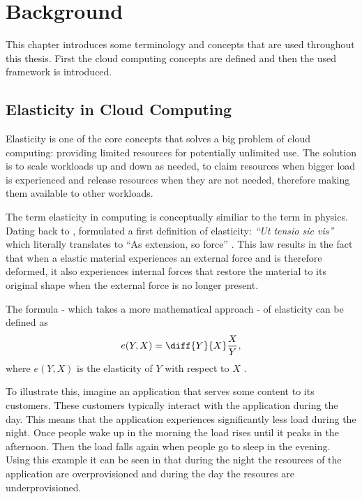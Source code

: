 \chapter{Background}
\label{ch:background}

This chapter introduces some terminology and concepts that are used throughout this thesis. First the cloud computing concepts are defined and then the used framework is introduced.

\section{Elasticity in Cloud Computing}
\label{sec:elasticity}

Elasticity is one of the core concepts that solves a big problem of cloud computing: providing limited resources for potentially unlimited use. The solution is to scale workloads up and down as needed, to claim resources when bigger load is experienced and release resources when they are not needed, therefore making them available to other workloads.

The term elasticity in computing is conceptually similiar to the term in physics. Dating back to \citeyear{hookLecturesPotentiaRestitutiva1678},  formulated a first definition of elasticity: \textit{``Ut tensio sic vis''} which literally translates to ``As extension, so force'' \cite{hookLecturesPotentiaRestitutiva1678}. This law results in the fact that when a elastic material experiences an external force and is therefore deformed, it also experiences internal forces that restore the material to its original shape when the external force is no longer present.

The formula - which takes a more mathematical approach - of elasticity can be defined as \[ e(Y, X) = \diff{Y}{X} \frac{X}{Y}, \] where \(e(Y, X)\) is the elasticity of \(Y\) with respect to \(X\) \cite{dustdarPrinciplesElasticProcesses2011}.

To illustrate this, imagine an application that serves some content to its customers. These customers typically interact with the application during the day. This means that the application experiences significantly less load during the night. Once people wake up in the morning the load rises until it peaks in the afternoon. Then the load falls again when people go to sleep in the evening. Using this example it can be seen in  that during the night the resources of the application are overprovisioned and during the day the resoures are underprovisioned.


